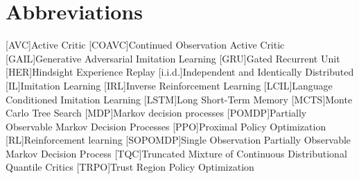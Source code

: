 
\chapter{Abbreviations}
\begin{acronym}
    [AVC]{Active Critic}
    [COAVC]{Continued Observation Active Critic}
    [GAIL]{Generative Adversarial Imitation Learning}
    [GRU]{Gated Recurrent Unit}
    [HER]{Hindsight Experience Replay}
    [i.i.d.]{Independent and Identically Distributed}
    [IL]{Imitation Learning}
    [IRL]{Inverse Reinforcement Learning}
    [LCIL]{Language Conditioned Imitation Learning}
    [LSTM]{Long Short-Term Memory}
    [MCTS]{Monte Carlo Tree Search}
    [MDP]{Markov decision processes}
    [POMDP]{Partially Observable Markov Decision Processes}
    [PPO]{Proximal Policy Optimization}
    [RL]{Reinforcement learning}
    [SOPOMDP]{Single Observation Partially Observable Markov Decision Process}
    [TQC]{Truncated Mixture of Continuous Distributional Quantile Critics}
    [TRPO]{Trust Region Policy Optimization}
\end{acronym}
